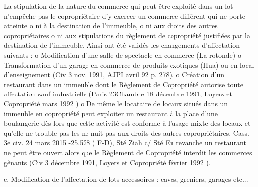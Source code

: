 				La stipulation de la nature du commerce qui peut être exploité dans un lot n'empêche pas le copropriétaire d'y exercer un commerce différent qui ne porte atteinte
				o ni à la destination de l'immeuble,
				o ni aux droits des autres copropriétaires
				o ni aux stipulations du règlement de copropriété justifiées par la destination de l’immeuble.
				Ainsi ont été validés les changements d’affectation suivants :
				o Modification d’une salle de spectacle en commerce (La rotonde)
				o Transformation d'un garage en commerce de produits exotiques (Hua) ou en local d'enseignement (Civ 3 nov. 1991, AJPI avril 92 p. 278).
				o Création d'un restaurant dans un immeuble dont le Règlement de Copropriété autorise toute affectation sauf industrielle (Paris 23\degres Chambre 18 décembre 1991; Loyers et Copropriété mars 1992 )
				o De même le locataire de locaux situés dans un immeuble en copropriété peut exploiter un restaurant à la place d'une boulangerie dès lors que cette activité est conforme à l’usage mixte des locaux et qu'elle ne trouble pas les ne nuit pas aux droits des autres copropriétaires. Cass. 3e civ. 24 mars 2015 -25.528 ( F-D), Sté Ziah c/ Sté
				En revanche un restaurant ne peut être ouvert alors que le Règlement de Copropriété interdit les commerces gênants (Civ 3 décembre 1991, Loyers et Copropriété février 1992 ).
			
			c. Modification de l'affectation de lots accessoires : caves, greniers, garages etc...

